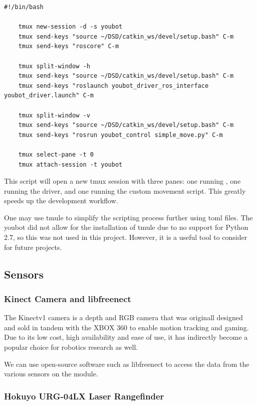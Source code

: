 \documentclass[a4paper, 12pt]{article}
\newif\ifshownotes
\newcommand{\notes}[1]{\ifshownotes\textcolor{blue}{#1}\fi}
\newcommand{\code}[1]{\texttt{\detokenize{#1}}}
\begin{document}
    \begin{lstlisting}[style=plain]
    #!/bin/bash

    tmux new-session -d -s youbot
    tmux send-keys "source ~/DSD/catkin_ws/devel/setup.bash" C-m
    tmux send-keys "roscore" C-m

    tmux split-window -h
    tmux send-keys "source ~/DSD/catkin_ws/devel/setup.bash" C-m
    tmux send-keys "roslaunch youbot_driver_ros_interface youbot_driver.launch" C-m

    tmux split-window -v
    tmux send-keys "source ~/DSD/catkin_ws/devel/setup.bash" C-m
    tmux send-keys "rosrun youbot_control simple_move.py" C-m

    tmux select-pane -t 0
    tmux attach-session -t youbot
    \end{lstlisting}

    This script will open a new tmux session with three panes: one running \code{roscore}, one running the driver, and one running the custom movement script. This greatly speeds up the development workflow.

    One may use tmule to simplify the scripting process further using toml files. The youbot did not allow for the installation of tmule due to no support for Python 2.7, so this was not used in this project. However, it is a useful tool to consider for future projects.
   
    
    \subsection{Sensors}
    \subsubsection{Kinect Camera and libfreenect}

    The Kinectv1 camera is a depth and RGB camera that was originall designed and sold in tandem with the XBOX 360 to enable motion tracking and gaming. Due to its low cost, high availability and ease of use, it has indirectly become a popular choice for robotics research as well. 

    We can use open-source software such as libfreenect to access the data from the various sensors on the module.


    \notes{discuss the libfreenect library, how to install it, and how it could be used within ROS.}


    \subsubsection{Hokuyo URG-04LX Laser Rangefinder}
\end{document}
